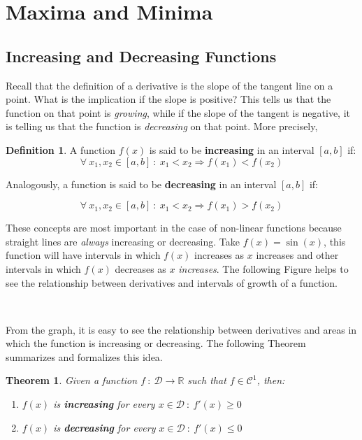 \documentclass[11pt]{article}
\theoremstyle{definition}
\newtheorem{definition}{Definition}
\theoremstyle{plain}
\newtheorem{theorem}{Theorem}
\begin{document}
\section{Maxima and Minima}\label{maxima-and-minima}

\subsection{Increasing and Decreasing
Functions}\label{increasing-and-decreasing-functions}

Recall that the definition of a derivative is the slope of the tangent
line on a point. What is the implication if the slope is positive? This
tells us that the function on that point is \emph{growing}, while if the
slope of the tangent is negative, it is telling us that the function is
\emph{decreasing} on that point. More precisely,

\begin{definition}
A function \(f(x)\) is said to be
\textbf{increasing} in an interval \([a,b]\) if: \[
\forall \ x_1,x_2\in[a,b] \ : \ x_1 < x_2 \Rightarrow f(x_1) < f(x_2)
\]

Analogously, a function is said to be \textbf{decreasing} in an interval
\([a,b]\) if:

\[
\forall \ x_1,x_2\in[a,b] \ : \ x_1 < x_2 \Rightarrow f(x_1) > f(x_2)
\]
\end{definition}

These concepts are most important in the case of non-linear functions
because straight lines are \emph{always} increasing or decreasing. Take
\(f(x) = \sin(x)\), this function will have intervals in which \(f(x)\)
increases as \(x\) increases and other intervals in which \(f(x)\)
decreases as \(x\) \emph{increases}. The following Figure helps to see
the relationship between derivatives and intervals of growth of a
function.

    \begin{center}
    \end{center}
    { \hspace*{\fill} \\}
    
    From the graph, it is easy to see the relationship between derivatives
and areas in which the function is increasing or decreasing. The
following Theorem summarizes and formalizes this idea.

\begin{theorem}
Given a function
\(f \ : \ \mathcal{D}\rightarrow\mathbb{R}\) such that
\(f\in\mathcal{C}^1\), then: 

\begin{enumerate}
    \item \(f(x)\) is \textbf{increasing} for every \(x\in\mathcal{D} \ : \ f'(x) \geq 0\) 

    \item \(f(x)\) is \textbf{decreasing} for every \(x\in\mathcal{D} \ : \ f'(x) \leq 0\)
\end{enumerate}
\end{theorem}
\end{document}
